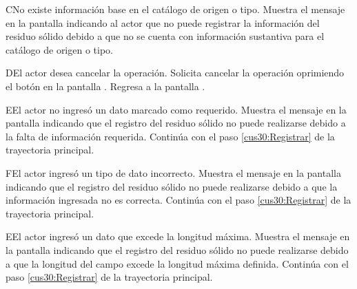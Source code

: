  \begin{UCtrayectoriaA}{C}{No existe información base en el catálogo de origen o tipo.}
    \UCpaso[\UCsist] Muestra el mensaje  en la pantalla  indicando al actor que no puede registrar la información del residuo sólido debido a que no se cuenta con información sustantiva para el catálogo de origen o tipo.
 \end{UCtrayectoriaA}
 
    \begin{UCtrayectoriaA}{D}{El actor desea cancelar la operación.}
    \UCpaso[\UCactor] Solicita cancelar la operación oprimiendo el botón  en la pantalla .
    \UCpaso[\UCsist] Regresa a la pantalla . 
    \end{UCtrayectoriaA}
 
    \begin{UCtrayectoriaA}{E}{El actor no ingresó un dato marcado como requerido.}    
    \UCpaso[\UCsist] Muestra el mensaje  en la pantalla  indicando que el registro del residuo sólido no puede realizarse debido a la falta de información requerida.
    \UCpaso[] Continúa con el paso \ref{cus30:Registrar} de la trayectoria principal.     
    \end{UCtrayectoriaA}
 
        \begin{UCtrayectoriaA}{F}{El actor ingresó un tipo de dato incorrecto.}    
    \UCpaso[\UCsist] Muestra el mensaje  en la pantalla  indicando que el registro del residuo sólido no puede realizarse debido a que la información ingresada no es correcta.
    \UCpaso[] Continúa con el paso \ref{cus30:Registrar} de la trayectoria principal.     
    \end{UCtrayectoriaA}
    
            \begin{UCtrayectoriaA}{E}{El actor ingresó un dato que excede la longitud máxima.}    
    \UCpaso[\UCsist] Muestra el mensaje  en la pantalla  indicando que el registro del residuo sólido no puede realizarse debido a que la longitud del campo excede la longitud máxima definida.
    \UCpaso[] Continúa con el paso \ref{cus30:Registrar} de la trayectoria principal.     
    \end{UCtrayectoriaA}
